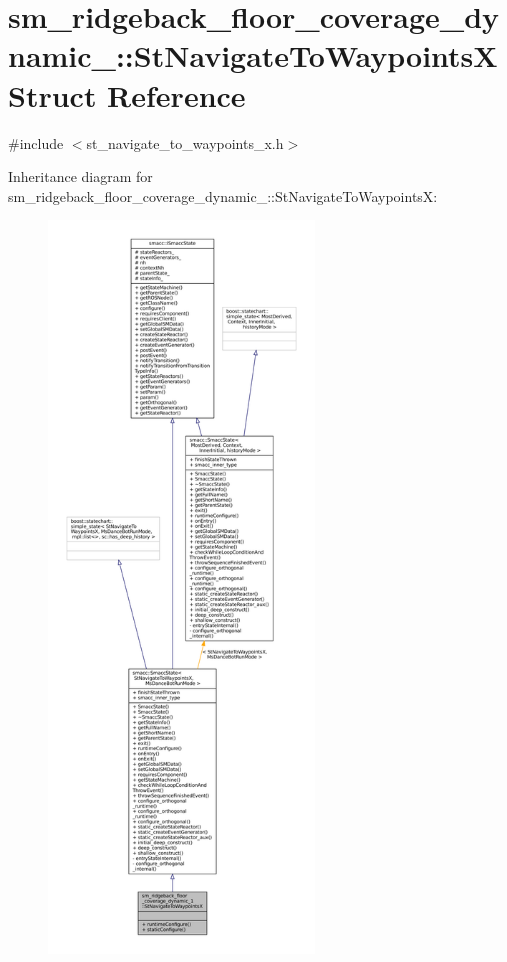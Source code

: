 \hypertarget{structsm__ridgeback__floor__coverage__dynamic__1_1_1StNavigateToWaypointsX}{}\section{sm\+\_\+ridgeback\+\_\+floor\+\_\+coverage\+\_\+dynamic\+\_\+:\+:St\+Navigate\+To\+WaypointsX Struct Reference}
\label{structsm__ridgeback__floor__coverage__dynamic__1_1_1StNavigateToWaypointsX}


{\ttfamily \#include $<$st\+\_\+navigate\+\_\+to\+\_\+waypoints\+\_\+x.\+h$>$}



Inheritance diagram for sm\+\_\+ridgeback\+\_\+floor\+\_\+coverage\+\_\+dynamic\+\_\+:\+:St\+Navigate\+To\+WaypointsX\+:
\nopagebreak
\begin{figure}[H]
\begin{center}
\leavevmode
\includegraphics[height=550pt]{structsm__ridgeback__floor__coverage__dynamic__1_1_1StNavigateToWaypointsX__inherit__graph}
\end{center}
\end{figure}


